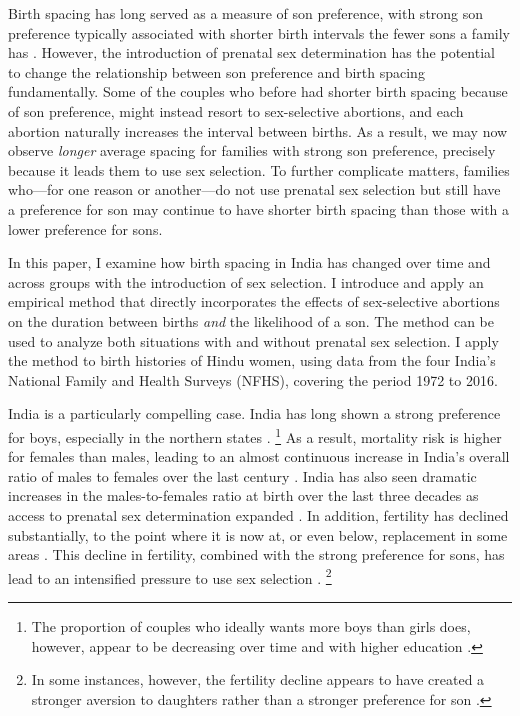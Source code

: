 Birth spacing has long served as a measure of son preference, with strong
son preference typically associated with shorter birth intervals the
fewer sons a family has \citep{ben-porath76b,Leung1988}.
However, the introduction of prenatal sex determination has the potential to 
change the relationship between son preference and birth spacing fundamentally.
Some of the couples who before had shorter birth spacing because of son preference,
might instead resort to sex-selective abortions, and each abortion naturally 
increases the interval between births.
As a result, we may now observe \emph{longer} average spacing for families with strong son 
preference, precisely because it leads them to use sex selection.
To further complicate matters, families who---for one reason or another---do 
not use prenatal sex selection but still have a preference for son may continue to have 
shorter birth spacing than those with a lower preference for sons.

In this paper, I examine how birth spacing in India has changed over time and across 
groups with the introduction of sex selection.
I introduce and apply an empirical method that directly incorporates the effects of 
sex-selective abortions on the duration between births 
\emph{and} 
the likelihood of a son. 
The method can be used to analyze both situations with and without prenatal
sex selection.
I apply the method to birth histories of Hindu women, using data from the four
India's National Family and Health Surveys (NFHS), covering the period 
1972 to 2016. 

India is a particularly compelling case.
India has long shown a strong preference for boys, especially in the northern 
states \citep{Kishor1993,murthi95,arnold98}.%
\footnote{
The proportion of couples who ideally wants more boys than girls does, however,
appear to be decreasing over time and with higher education \citep{bhat03,pande07}.
}
As a result, mortality risk is higher for females than males, leading to an almost
continuous increase in India's overall ratio of males to females over the last century 
\citep{dyson01,Navaneetham2011,Bongaarts2015}.
India has also seen dramatic increases in the males-to-females ratio  
at birth over the last three decades as access to prenatal sex determination 
expanded \citep{das_gupta97,Sudha1999,Arnold2002,retherford03b,jha06,Guilmoto2012}.
In addition, fertility has declined substantially, to the point where it is now
at, or even below, replacement in some areas 
\citep{Guilmoto2013,Dharmalingam2014,International-Institute-for-Population-Sciences-IIPS2017}.
This decline in fertility, combined with the strong preference for sons, has lead to an 
intensified pressure to use sex selection \citet{Guilmoto2009a,Jayachandran2017}.%
\footnote{
In some instances, however, the fertility decline appears to have created a stronger 
aversion to daughters rather than a stronger preference for son \citet{DiamondSmith2008}.
}
 
